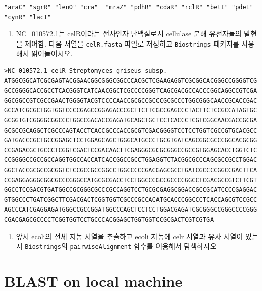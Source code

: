 \documentclass[
]{book}
\providecommand{\tightlist}{%
  \setlength{\itemsep}{0pt}\setlength{\parskip}{0pt}}
\begin{document}
\begin{verbatim}
"araC" "sgrR" "leuO" "cra"  "mraZ" "pdhR" "cdaR" "rclR" "betI" "pdeL" "cynR" "lacI"
\end{verbatim}

\begin{enumerate}
\def\labelenumi{\arabic{enumi})}
\setcounter{enumi}{4}
\tightlist
\item
  \href{https://www.ncbi.nlm.nih.gov/nuccore/NC_010572.1?from=5569768\&to=5570805\&report=genbank}{NC\_010572.1}는 celR이라는 전사인자 단백질로서 cellulase 분해 유전자들의 발현을 제어함. 다음 서열을 \texttt{celR.fasta} 파일로 저장하고 \texttt{Biostrings} 패키지를 사용해서 읽어들이시오.
\end{enumerate}

\begin{verbatim}
>NC_010572.1 celR Streptomyces griseus subsp.
ATGGCGGCATCGCGAGTACGGAACGGCGGGCGGCCCACGCTCGAAGAGGTCGCGGCACGGGCCGGGGTCG
GCCGGGGCACCGCCTCACGGGTCATCAACGGCTCGCCCCGGGTCAGCGACGCCACCCGGCAGGCCGTCGA
GGCGGCCGTCGCCGAACTGGGGTACGTCCCCAACCGCGCCGCCCGCGCCCTGGCGGGCAACCGCACCGAC
GCCATCGCGCTGGTGGTCCCCGAGCCGGAGACCCGCTTCTTCGCCGAGCCCTACTTCTCCGCCATAGTGC
GCGGTGTCGGGGCGGCCCTGGCCGACACCGAGATGCAGCTGCTCCTCACCCTCGTCGGCAACGACCGCGA
GCGCCGCAGGCTCGCCCAGTACCTCACCGCCCACCGCGTCGACGGGGTCCTCCTGGTCGCCGTGCACGCC
GATGACCCGCTGCCGGAGCTCCTGGAGCAGCTGGGCATGCCCTGCGTGATCAGCGGCGCCCGGCACGCGG
CCGAGACGCTGCCCTCGGTCGACTCCGACAACTTCGAGGGCGCGCGGGCCGCCGTGGAGCACCTGGTCTC
CCGGGGCCGCCGCCAGGTGGCCACCATCACCGGCCGCCTGGAGGTCTACGGCGCCCAGCGCCGCCTGGAC
GGCTACCGCGCCGCGGTCTCCGCCGCCGGCCTGGCCCCCGACGAGCGCCTGATCGCCCCGGCCGACTTCA
CCGAGGAGGGCGGCGCCCGGGCCATGCGCGACCTCCTGGCCCGCCGCCCCGGCCTCGACGCCGTCTTCGT
GGCCTCCGACGTGATGGCCGCGGGCGCCCGCCAGGTCCTGCGCGAGGCGGACCGCCGCATCCCCGAGGAC
GTGGCCCTGATCGGCTTCGACGACTCGGTGGTCGCCCGCCACATGCACCCGGCCCTCACCAGCGTCCGCC
AGCCCATCGAGGAGATGGGCCGCCGGATGGCCCAGCTCCTCCTGGACGAGATCGCGGGCCGGGCCCCGGG
CGACGAGCGCCCCTCGGTGGTCCTGCCCACGGAGCTGGTGGTCCGCGACTCGTCGTGA
\end{verbatim}

\begin{enumerate}
\def\labelenumi{\arabic{enumi})}
\setcounter{enumi}{5}
\tightlist
\item
  앞서 ecoli의 전체 지놈 서열을 추출하고 ecoli 지놈에 celr 서열과 유사 서열이 있는지 \texttt{Biostrings}의 \texttt{pairwiseAlignment} 함수를 이용해서 탐색하시오
\end{enumerate}

\hypertarget{blast-on-local-machine}{%
\chapter{BLAST on local machine}\label{blast-on-local-machine}}
\end{document}
